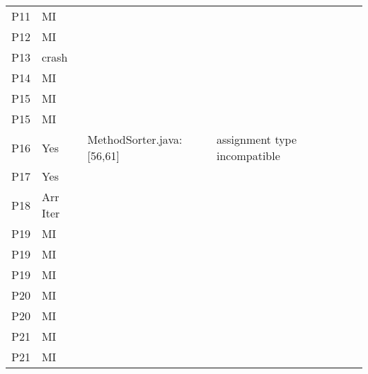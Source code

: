 \begin{table}[]
\begin{tabular}{|p{1.5cm}|p{1cm}|p{3cm}|p{4cm}|p{2cm}|p{1.5cm}|}
        P11 & MI &  &  &  &  \\
        P12 & MI &  &  &  &  \\
        P13 & crash &  &  &  &  \\
        P14 & MI &  &  &  &  \\
        P15 & MI &  &  &  &  \\
        P15 & MI &  &  &  &  \\
        P16 & Yes & MethodSorter.java: [56,61]  & assignment type incompatible &  &  \\
        P17 & Yes &  &  &  &  \\
        P18 & Arr Iter &  &  &  &  \\
        P19 & MI &  &  &  &  \\
        P19 & MI &  &  &  &  \\
        P19 & MI &  &  &  &  \\
        P20 & MI &  &  &  &  \\
        P20 & MI &  &  &  &  \\
        P21 & MI &  &  &  &  \\
        P21 & MI &  &  &  &  \\ \hline
    \end{tabular}
\end{table}
